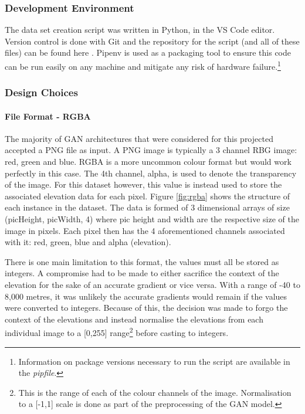 \documentclass[a4paper]{report}
\begin{document}
\subsubsection{Development Environment}
The data set creation script was written in Python, in the VS Code editor. Version control is done with Git and the repository for the script (and all of these files) can be found here \cite{github}. Pipenv is used as a packaging tool to ensure this code can be run easily on any machine and mitigate any risk of hardware failure.\footnote{Information on package versions necessary to run the script are available in the \textit{pipfile}.}

\subsubsection{Design Choices}
\paragraph{File Format - RGBA}
The majority of GAN architectures that were considered for this projected accepted a PNG file as input. A PNG image is typically a 3 channel RBG image: red, green and blue. RGBA is a more uncommon colour format but would work perfectly in this case. The 4th channel, alpha, is used to denote the transparency of the image. For this dataset however, this value is instead used to store the associated elevation data for each pixel. Figure \ref{fig:rgba} shows the structure of each instance in the dataset. The data is formed of 3 dimensional arrays of size (picHeight, picWidth, 4) where pic height and width are the respective size of the image in pixels. Each pixel then has the 4 aforementioned channels associated with it: red, green, blue and alpha (elevation).

There is one main limitation to this format, the values must all be stored as integers. A compromise had to be made to either sacrifice the context of the elevation for the sake of an accurate gradient or vice versa. With a range of -40 to 8,000 metres, it was unlikely the accurate gradients would remain if the values were converted to integers. Because of this, the decision was made to forgo the context of the elevations and instead normalise the elevations from each individual image to a [0,255] range\footnote{This is the range of each of the colour channels of the image. Normalisation to a [-1,1] scale is done as part of the preprocessing of the GAN model.} before casting to integers.
\end{document}
